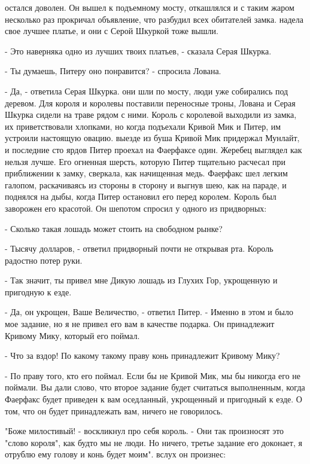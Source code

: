  остался доволен. Он вышел к подъемному мосту, откашлялся и 
с таким жаром несколько раз прокричал объявление, что разбудил всех 
обитателей замка.
 надела свое лучшее платье, и они с Серой Шкуркой тоже 
вышли.
\par- Это наверняка одно из лучших твоих платьев, - сказала Серая 
Шкурка.
\par- Ты думаешь, Питеру оно понравится? - спросила Лована.
\par- Да, - ответила Серая Шкурка.
 они шли по мосту, люди уже собирались под деревом. Для 
короля и королевы поставили переносные троны, Лована и Серая Шкурка 
сидели на траве рядом с ними. Король с королевой выходили из замка, их 
приветствовали хлопками, но когда подъехали Кривой Мик и Питер, им 
устроили настоящую овацию.
 выезде из буша Кривой Мик придержал Мунлайт, и последние сто 
ярдов Питер проехал на Фаерфаксе один. Жеребец выглядел как нельзя 
лучше. Его огненная шерсть, которую Питер тщательно расчесал при 
приближении к замку, сверкала, как начищенная медь. Фаерфакс шел 
легким галопом, раскачиваясь из стороны в сторону и выгнув шею, как на 
параде, и поднялся на дыбы, когда Питер остановил его перед королем. 
Король был заворожен его красотой. Он шепотом спросил у одного из 
придворных:
\par- Сколько такая лошадь может стоить на свободном рынке?
\par- Тысячу долларов, - ответил придворный почти не открывая рта. 
Король радостно потер руки.
\par- Так значит, ты привел мне Дикую лошадь из Глухих Гор, укрощенную 
и пригодную к езде.
\par- Да, он укрощен, Ваше Величество, - ответил Питер. - Именно в 
этом и было мое задание, но я не привел его вам в качестве подарка. Он 
принадлежит Кривому Мику, который его поймал.
\par- Что за вздор! По какому такому праву конь принадлежит Кривому 
Мику?
\par- По праву того, кто его поймал. Если бы не Кривой Мик, мы бы 
никогда его не поймали. Вы дали слово, что второе задание будет 
считаться выполненным, когда Фаерфакс будет приведен к вам оседланный, 
укрощенный и пригодный к езде. О том, что он будет принадлежать вам, 
ничего не говорилось.
\par"Боже милостивый! - воскликнул про себя король. - Они так 
произносят это "слово короля", как будто мы не люди. Но ничего, третье 
задание его доконает, я отрублю ему голову и конь будет моим".
 вслух он произнес:
